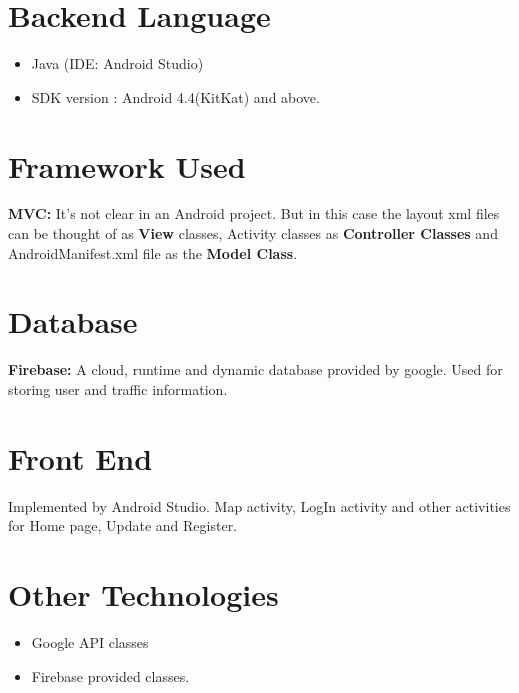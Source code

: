 \documentclass{article}
\begin{document}
\section{Backend Language}
\begin{itemize}
\item Java (IDE: Android Studio)
\item SDK version : Android 4.4(KitKat) and above.
\end{itemize}
\section{Framework Used}
\textbf{MVC:} It's not clear in an Android project. But in this case the layout xml files can be thought of as \textbf{View} classes, Activity classes as \textbf{Controller Classes} and AndroidManifest.xml file as the \textbf{Model Class}.
\section{Database}
\textbf{Firebase:} A cloud, runtime and dynamic database provided by google. Used for storing user and traffic information.
\section{Front End}
Implemented by Android Studio. Map activity, LogIn activity and other activities for Home page, Update and Register.
\section{Other Technologies}
\begin{itemize}
\item Google API classes
\item Firebase provided classes.
\end{itemize}
\end{document}
